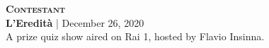 \textbf{\textsc{Contestant}} \\
\textbf{L'Eredità} | December 26, 2020 \\
A prize quiz show aired on Rai 1, hosted by Flavio Insinna.
\begin{center}
    \label{fig:eredita}	
\end{center}